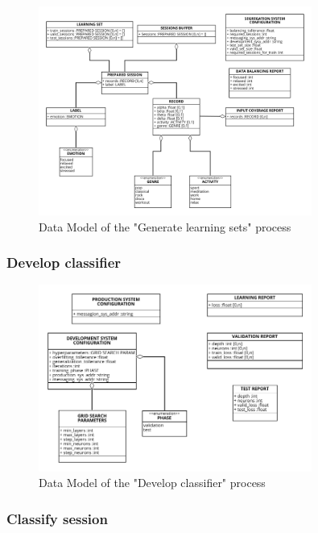 \begin{figure}[H]
\centering
\includegraphics[width=0.8\textwidth]{figures/Data Model - Generate Learning Sets.png}
\caption{Data Model of the "Generate learning sets" process}
\label{fig:data_generate_learning_sets}
\end{figure}

\subsubsection{Develop classifier}
\label{sec:data_develop_classifier}

\begin{figure}[H]
\centering
\includegraphics[width=0.8\textwidth]{figures/Data Model - Develop Classifier.png}
\caption{Data Model of the "Develop classifier" process}
\label{fig:data_develop_classifier}
\end{figure}

\subsubsection{Classify session}
\label{sec:data_classify_session}

